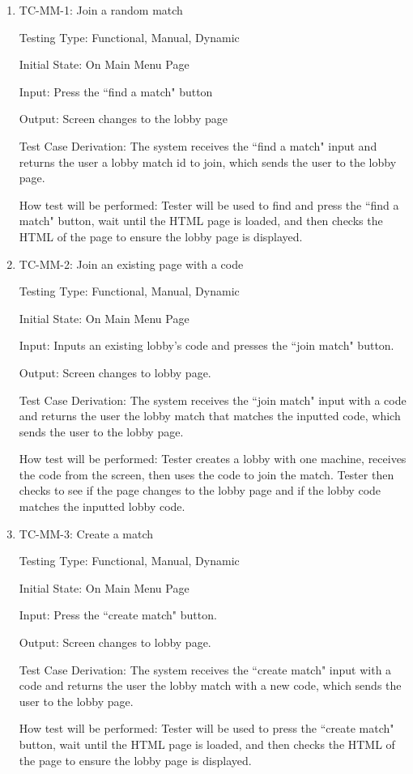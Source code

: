 \documentclass[12pt, titlepage]{article}
\begin{document}
\begin{enumerate}

\item{TC-MM-1: Join a random match}

Testing Type: Functional, Manual, Dynamic
					
Initial State: On Main Menu Page
					
Input: Press the ``find a match" button
					
Output: Screen changes to the lobby page

Test Case Derivation: The system receives the ``find a match" input and returns the user a lobby match id to join, which sends the user to the lobby page.
					
How test will be performed: Tester will be used to find and press the ``find a match" button, wait until the HTML page is loaded, and then checks the HTML of the page to ensure the lobby page is displayed.
					
\item{TC-MM-2: Join an existing page with a code}

Testing Type: Functional, Manual, Dynamic
					
Initial State: On Main Menu Page
					
Input: Inputs an existing lobby's code and presses the ``join match" button.
					
Output: Screen changes to lobby page.

Test Case Derivation: The system receives the ``join match" input with a code and returns the user the lobby match that matches the inputted code, which sends the user to the lobby page.
					
How test will be performed: Tester creates a lobby with one machine, receives the code from the screen, then uses the code to join the match. Tester then checks to see if the page changes to the lobby page and if the lobby code matches the inputted lobby code.

\item{TC-MM-3: Create a match}

Testing Type: Functional, Manual, Dynamic 
					
Initial State: On Main Menu Page
					
Input: Press the ``create match" button.
					
Output: Screen changes to lobby page.

Test Case Derivation: The system receives the ``create match" input with a code and returns the user the lobby match with a new code, which sends the user to the lobby page.
					
How test will be performed: Tester will be used to press the ``create match" button, wait until the HTML page is loaded, and then checks the HTML of the page to ensure the lobby page is displayed.

\end{enumerate}
\end{document}
